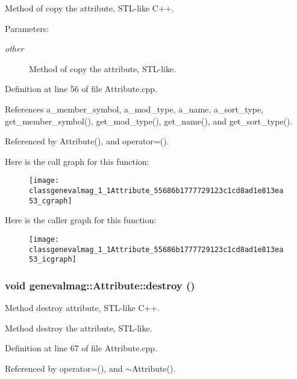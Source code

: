 Method of copy the attribute, STL-like C++. \begin{Desc}
\item[Parameters:]
\begin{description}
\item[{\em other}]Method of copy the attribute, STL-like. \end{description}
\end{Desc}


Definition at line 56 of file Attribute.cpp.

References a\_\-member\_\-symbol, a\_\-mod\_\-type, a\_\-name, a\_\-sort\_\-type, get\_\-member\_\-symbol(), get\_\-mod\_\-type(), get\_\-name(), and get\_\-sort\_\-type().

Referenced by Attribute(), and operator=().

Here is the call graph for this function:\nopagebreak
\begin{figure}[H]
\begin{center}
\leavevmode
\texttt{[image: classgenevalmag\_1\_1Attribute\_55686b1777729123c1cd8ad1e813ea53\_cgraph]}
\end{center}
\end{figure}


Here is the caller graph for this function:\nopagebreak
\begin{figure}[H]
\begin{center}
\leavevmode
\texttt{[image: classgenevalmag\_1\_1Attribute\_55686b1777729123c1cd8ad1e813ea53\_icgraph]}
\end{center}
\end{figure}
\hypertarget{classgenevalmag_1_1Attribute_bdc7b01e147fd9b112f8d786a9e5f027}{
\subsubsection[{destroy}]{\setlength{\rightskip}{0pt plus 5cm}void genevalmag::Attribute::destroy ()}}
\label{classgenevalmag_1_1Attribute_bdc7b01e147fd9b112f8d786a9e5f027}


Method destroy attribute, STL-like C++.

Method destroy the attribute, STL-like. 

Definition at line 67 of file Attribute.cpp.

Referenced by operator=(), and $\sim$Attribute().

